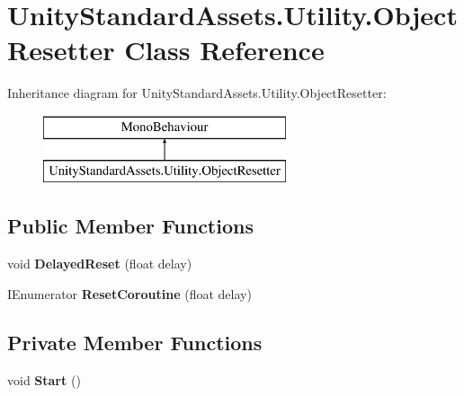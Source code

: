 \hypertarget{class_unity_standard_assets_1_1_utility_1_1_object_resetter}{}\section{Unity\+Standard\+Assets.\+Utility.\+Object\+Resetter Class Reference}
\label{class_unity_standard_assets_1_1_utility_1_1_object_resetter}
Inheritance diagram for Unity\+Standard\+Assets.\+Utility.\+Object\+Resetter\+:\begin{figure}[H]
\begin{center}
\leavevmode
\includegraphics[height=2.000000cm]{class_unity_standard_assets_1_1_utility_1_1_object_resetter}
\end{center}
\end{figure}
\subsection*{Public Member Functions}
\begin{DoxyCompactItemize}
\item 
\mbox{\label{class_unity_standard_assets_1_1_utility_1_1_object_resetter_ab44d29e021b02f8bf2a65fdd9500669f}} 
void {\bfseries Delayed\+Reset} (float delay)
\item 
\mbox{\label{class_unity_standard_assets_1_1_utility_1_1_object_resetter_a9f642e892d90f0720be3d1dbff5d8d93}} 
I\+Enumerator {\bfseries Reset\+Coroutine} (float delay)
\end{DoxyCompactItemize}
\subsection*{Private Member Functions}
\begin{DoxyCompactItemize}
\item 
\mbox{\label{class_unity_standard_assets_1_1_utility_1_1_object_resetter_ab0e5ac14903cec6fdbd5a4eb7449ef5a}} 
void {\bfseries Start} ()
\end{DoxyCompactItemize}
